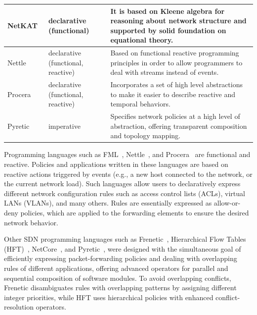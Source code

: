 {\begin{table}[!htp]
\begin{center}
\begin{tabularx}{\linewidth}{p{2cm}p{4cm}X}
{NetKAT~\cite{Anderson2014_4}}  & {declarative (functional)} & {It is based on Kleene algebra for reasoning about network structure and supported by solid foundation on equational theory.} \\\hline

Nettle~\cite{voellmy2011-1}   & declarative (functional, reactive) & Based on functional reactive programming  principles in order to allow programmers to deal with streams instead of events.   \\\hline

Procera~\cite{voellmy2012}  & declarative (functional, reactive) & Incorporates a set of high level abstractions to make it easier to describe reactive and temporal behaviors.  \\\hline
Pyretic~\cite{monsanto2013}  & imperative & Specifies network policies at a high level of abstraction, offering transparent composition and topology mapping. \\\hline
\end{tabularx}
\end{center}
\end{table}
}


Programming languages such as FML~\cite{hinrichs2009}, 
Nettle~\cite{voellmy2011-1}, and Procera~\cite{voellmy2012}
are functional and reactive.
Policies and applications written in these languages are based on reactive actions triggered by events (e.g., a new host connected to the network, or the current network load).
Such languages allow users to declaratively express different network configuration rules such as access control lists (ACLs), virtual LANs (VLANs), and many others.
Rules are essentially expressed as allow-or-deny policies, which 
are applied to the forwarding elements to ensure the desired network behavior.

Other SDN programming languages such as Frenetic~\cite{foster2011},
Hierarchical Flow Tables (HFT)~\cite{ferguson2012}, NetCore~\cite{monsanto2012}, and
Pyretic~\cite{monsanto2013}, were designed with the simultaneous goal of efficiently expressing packet-forwarding policies and dealing with overlapping rules of different applications, offering advanced operators for parallel and sequential composition of software modules.
To avoid overlapping conflicts, Frenetic disambiguates rules 
with overlapping patterns by assigning different integer priorities, while HFT uses hierarchical policies with 
enhanced conflict-resolution operators.


